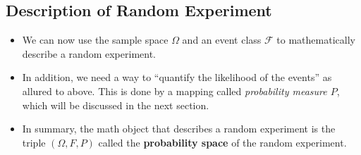 \subsection{Description of Random Experiment}
\begin{itemize}
\item We can now use the sample space \(\Omega\) and an event class \(\mathcal{F}\) to
    mathematically describe a random experiment. 
\item In addition, we need a way to ``quantify the likelihood of the
  events'' as allured to above. This is done by a mapping called
  \emph{probability measure \(P\)}, which will be discussed in the next section.
\item In summary, the math object that describes a random experiment is
  the triple \((\Omega, F, P)\) called the \textbf{probability space}
  of the random experiment.
\end{itemize}
